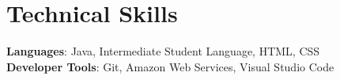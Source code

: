 \documentclass[letterpaper,11pt]{article}
\begin{document}

\section{Technical Skills}
 \begin{itemize}[leftmargin=0.15in, label={}]
    \small{\item{
     \textbf{Languages}{: Java, Intermediate Student Language, HTML, CSS} \\
     \textbf{Developer Tools}{: Git, Amazon Web Services, Visual Studio Code} \\
    }}
 \end{itemize}

\end{document}
